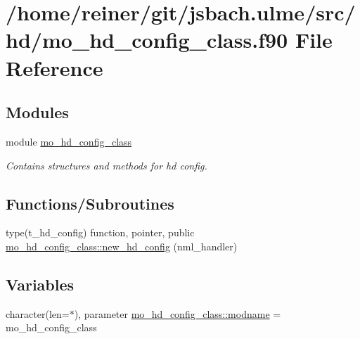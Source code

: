 \hypertarget{mo__hd__config__class_8f90}{}\section{/home/reiner/git/jsbach.ulme/src/hd/mo\+\_\+hd\+\_\+config\+\_\+class.f90 File Reference}
\label{mo__hd__config__class_8f90}
\subsection*{Modules}
\begin{DoxyCompactItemize}
\item 
module \hyperlink{namespacemo__hd__config__class}{mo\+\_\+hd\+\_\+config\+\_\+class}
\begin{DoxyCompactList}\small\item\em Contains structures and methods for hd config. \end{DoxyCompactList}\end{DoxyCompactItemize}
\subsection*{Functions/\+Subroutines}
\begin{DoxyCompactItemize}
\item 
type(t\+\_\+hd\+\_\+config) function, pointer, public \hyperlink{namespacemo__hd__config__class_acc4bf17e3db786bdbe4c6634717b53f7}{mo\+\_\+hd\+\_\+config\+\_\+class\+::new\+\_\+hd\+\_\+config} (nml\+\_\+handler)
\end{DoxyCompactItemize}
\subsection*{Variables}
\begin{DoxyCompactItemize}
\item 
character(len=$\ast$), parameter \hyperlink{namespacemo__hd__config__class_a0541298ddcbe68dca19b1f7b1352d9e7}{mo\+\_\+hd\+\_\+config\+\_\+class\+::modname} = \textquotesingle{}mo\+\_\+hd\+\_\+config\+\_\+class\textquotesingle{}
\end{DoxyCompactItemize}
